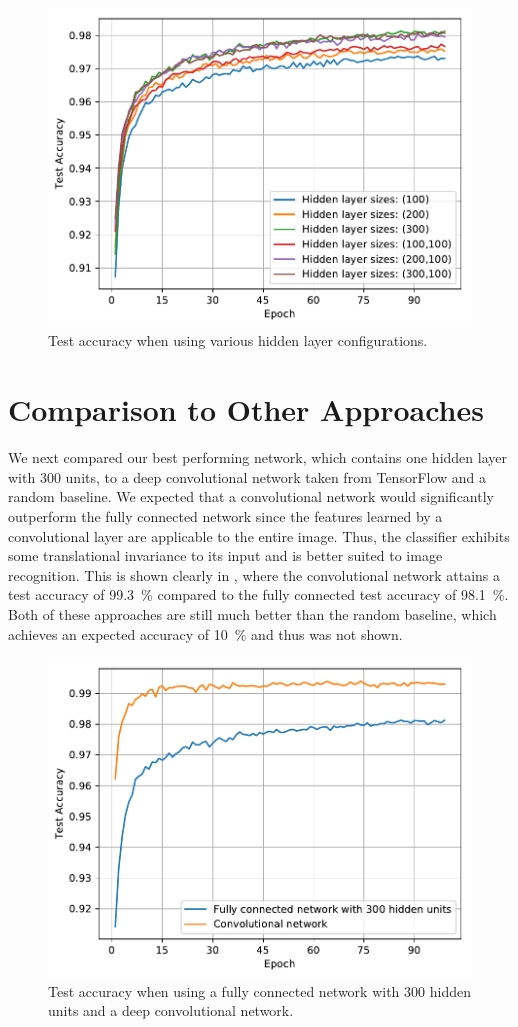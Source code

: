 \documentclass[journal,hidelinks]{IEEEtran}
\begin{document}
\begin{figure}[!htb]
  \centering
  \includegraphics[width=0.8\columnwidth]{plots/network_size_zoom.pdf}
  \caption{Test accuracy when using various hidden layer configurations.}
  \label{fig:network_size}
\end{figure}

\section{Comparison to Other Approaches}

We next compared our best performing network, which contains one hidden layer with $300$ units, to a deep convolutional network taken from TensorFlow \cite{tensorflow} and a random baseline. We expected that a convolutional network would significantly outperform the fully connected network since the features learned by a convolutional layer are applicable to the entire image. Thus, the classifier exhibits some translational invariance to its input and is better suited to image recognition. This is shown clearly in , where the convolutional network attains a test accuracy of \SI{99.3}{\percent} compared to the fully connected test accuracy of \SI{98.1}{\percent}. Both of these approaches are still much better than the random baseline, which achieves an expected accuracy of \SI{10}{\percent} and thus was not shown.

\begin{figure}[!htb]
  \centering
  \includegraphics[width=0.8\columnwidth]{plots/network_comparison.pdf}
  \caption{Test accuracy when using a fully connected network with $300$ hidden units and a deep convolutional network.}
  \label{fig:network_comparison}
\end{figure}
\end{document}
